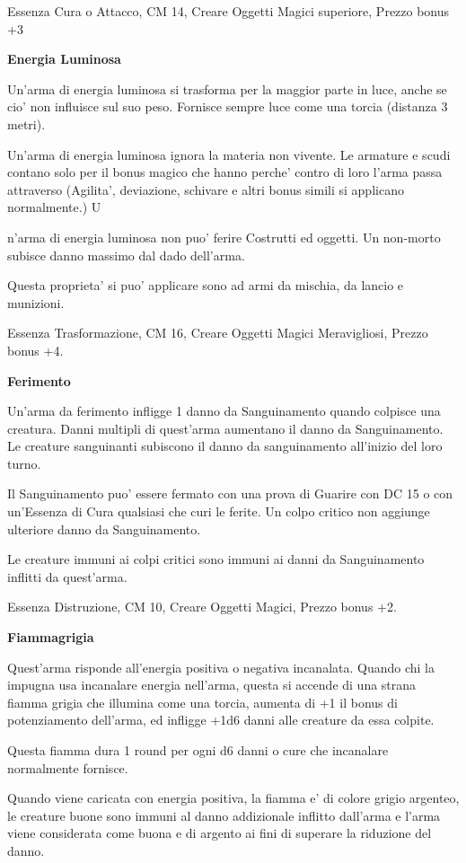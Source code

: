 \documentclass[a4paper,11pt,twoside,openany]{book}
\begin{document}
{		Essenza Cura o Attacco, CM 14, Creare Oggetti Magici superiore, Prezzo bonus +3
		
		\textbf{Energia Luminosa}
		
		Un'arma di energia luminosa si trasforma per la maggior parte in luce, anche se cio' non influisce sul suo peso. Fornisce sempre luce come una torcia (distanza 3 metri). 
		
		Un'arma di energia luminosa ignora la materia non vivente. Le armature e scudi contano solo per il bonus magico che hanno perche' contro di loro l'arma passa attraverso (Agilita', deviazione, schivare e altri bonus simili si applicano normalmente.) U
		
		n'arma di energia luminosa non puo' ferire Costrutti ed oggetti. Un non-morto subisce danno massimo dal dado dell'arma. 
		
		Questa proprieta' si puo' applicare sono ad armi da mischia, da lancio e munizioni. 
		
		Essenza Trasformazione, CM 16, Creare Oggetti Magici Meravigliosi, Prezzo bonus +4.
		
		\textbf{Ferimento}
		
		Un'arma da ferimento infligge 1 danno da Sanguinamento quando colpisce una creatura. Danni multipli di quest'arma aumentano il danno da Sanguinamento. Le creature sanguinanti subiscono il danno da sanguinamento all'inizio del loro turno.
		
		Il Sanguinamento puo' essere fermato con una prova di Guarire con DC 15 o con un'Essenza di Cura qualsiasi che curi le ferite. Un colpo critico non aggiunge ulteriore danno da Sanguinamento.
		
		Le creature immuni ai colpi critici sono immuni ai danni da Sanguinamento inflitti da quest'arma.
		
		Essenza Distruzione, CM 10, Creare Oggetti Magici, Prezzo bonus +2.
		
		\textbf{Fiammagrigia}
		
		Quest’arma risponde all'energia positiva o negativa incanalata. Quando chi la impugna usa incanalare energia nell'arma, questa si accende di una strana fiamma grigia che illumina come una torcia, aumenta di +1 il bonus di potenziamento dell'arma, ed infligge +1d6 danni alle creature da essa colpite.
		
		Questa fiamma dura 1 round per ogni d6 danni o cure che incanalare normalmente fornisce.
		
		Quando viene caricata con energia positiva, la fiamma e' di colore grigio argenteo, le creature buone sono immuni al danno addizionale inflitto dall'arma e l’arma viene considerata come buona e di argento ai fini di superare la riduzione del danno.
		
}
\end{document}
